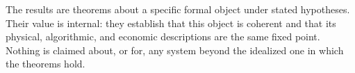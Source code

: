 \documentclass[11pt,twocolumn,a4paper]{article}
\theoremstyle{definition}
\theoremstyle{remark}
\begin{document}
The results are theorems about a specific formal object under stated hypotheses. Their value is internal: they establish that this object is coherent and that its physical, algorithmic, and economic descriptions are the same fixed point. Nothing is claimed about, or for, any system beyond the idealized one in which the theorems hold.



\end{document}
